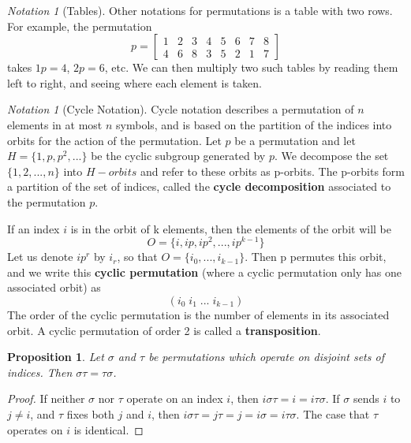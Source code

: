 \documentclass[12pt]{article}
\newtheorem{prop}[thm]{Proposition}
\theoremstyle{definition}
\theoremstyle{remark}
\newtheorem{nota}[thm]{Notation}
\numberwithin{equation}{section}
\newcommand\B[1]{\textbf{ #1}}
\begin{document}
\begin{nota}[Tables]
        Other notations for permutations is a table with two rows. For example, the permutation \begin{equation}
                p = \begin{bmatrix} 1 & 2 & 3 & 4 & 5 & 6 & 7 & 8 \\ 4 & 6 & 8 & 3 & 5 & 2 & 1 & 7 \end{bmatrix}
        \end{equation}
        takes $1p = 4$, $2p=6$, etc. We can then multiply two such tables by reading them left to right, and seeing where each element is taken.
\end{nota}


\vspace{15pt}


\begin{nota}[Cycle Notation]
        Cycle notation describes a permutation of $n$ elements in at most $n$ symbols, and is based on the partition of the indices into orbits for the action of the permutation. Let $p$ be a permutation and let $H = \{1,p,p^2,...\}$ be the cyclic subgroup generated by $p$. We decompose the set $\{1,2,...,n\}$ into $H-orbits$ and refer to these orbits as p-orbits. The p-orbits form a partition of the set of indices, called the \B{cycle decomposition} associated to the permutation $p$. 

        If an index $i$ is in the orbit of k elements, then the elements of the orbit will be \begin{equation}
                O=\{i,ip,ip^2,...,ip^{k-1}\}
        \end{equation}
        Let us denote $ip^r$ by $i_r$, so that $O = \{i_0,...,i_{k-1}\}$. Then p permutes this orbit, and we write this \B{cyclic permutation} (where a cyclic permutation only has one associated orbit) as \begin{equation}
                (i_0\;i_1\;...\;i_{k-1})
        \end{equation}
        The order of the cyclic permutation is the number of elements in its associated orbit. A cyclic permutation of order 2 is called a \B{transposition}.
\end{nota}


\vspace{15pt}


\begin{prop}
        Let $\sigma$ and $\tau$ be permutations which operate on disjoint sets of indices. Then $\sigma\tau = \tau\sigma$. 
\end{prop}
\begin{proof}
        If neither $\sigma$ nor $\tau$ operate on an index $i$, then $i\sigma\tau = i = i\tau\sigma$. If $\sigma$ sends $i$ to $j \neq i$, and $\tau$ fixes both $j$ and $i$, then $i\sigma\tau = j\tau = j = i\sigma = i\tau\sigma$. The case that $\tau$ operates on $i$ is identical.
\end{proof}
\end{document}
